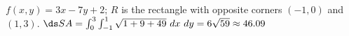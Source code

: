{$f(x,y) = 3x-7y+2$; $R$ is the rectangle with opposite corners $(-1,0)$ and $(1,3)$.
}
{$\ds SA = \int_{0}^{3}\int_{-1}^{1} \sqrt{1+ 9+49}\ dx\ dy = 6\sqrt{59} \approx 46.09$
}